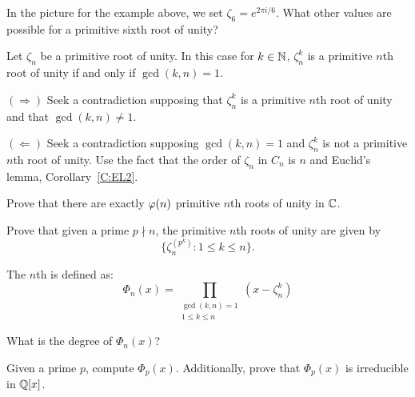 \documentclass{ximera}
\begin{document}
\begin{exercise}
  In the picture for the example above, we set $\zeta_6 =e^{2\pi
    i/6}$. What other values are possible for a primitive sixth root
  of unity?
\end{exercise}




\begin{theorem} 
Let $\zeta_n$ be a primitive root of unity. In this case for $k\in\mathbb N$,
$\zeta_n^k$ is a primitive $n$th root of unity if and only if
$\gcd(k,n) = 1$.

\begin{sketch} 
$(\Rightarrow)$ Seek a contradiction supposing that $\zeta_n^k$ is a
  primitive $n$th root of unity and that $\gcd(k,n) \ne 1$.

$(\Leftarrow)$ Seek a contradiction supposing $\gcd(k,n) = 1$ and
  $\zeta_n^k$ is not a primitive $n$th root of unity. Use the fact
  that the order of $\zeta_n$ in $C_n$ is $n$ and Euclid's lemma,
  Corollary~\ref{C:EL2}.
\end{sketch}
\end{theorem}



\begin{exercise}
  Prove that there are exactly $\eulerphi(n)$ primitive $n$th roots of
  unity in $\mathbb C$.
\end{exercise}


\begin{exercise}\label{E:KP}
  Prove that given a prime $p\nmid n$, the primitive $n$th roots of
  unity are given by
  \[
  \{\zeta_n^{(p^k)}: 1\le k \le n\}.
  \]
\end{exercise}




\begin{definition}
The $n$th  is defined as:
\[
\Phi_n(x) = \prod_{\substack{\gcd(k,n)=1 \\ 1\le k\le n}}(x-\zeta_n^k)
\]
\end{definition}

\begin{exercise}
  What is the degree of $\Phi_n(x)$?
\end{exercise}

\begin{exercise}
  Given a prime $p$, compute $\Phi_p(x)$. Additionally, prove that
  $\Phi_p(x)$ is irreducible in $\mathbb Q[x]$.
\end{exercise}
\end{document}
